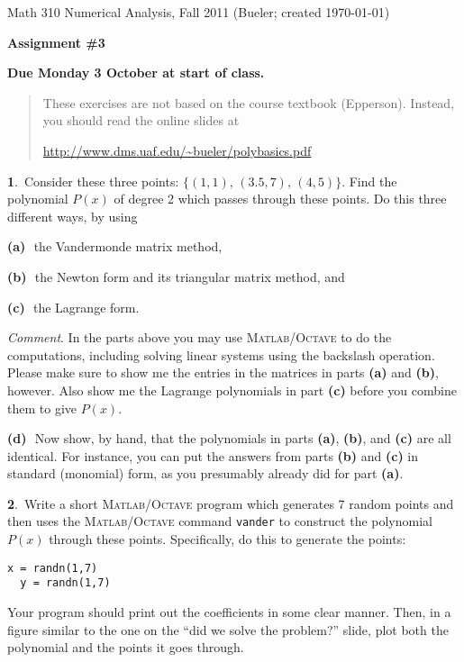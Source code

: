 \documentclass[12pt]{amsart}
\newcommand{\normalspacing}{\renewcommand{\baselinestretch}{1.1}
        \tiny\normalsize}
\newcommand{\prob}[1]{\bigskip\noindent\large\textbf{#1}.\,\normalsize }
\newcommand{\epart}[1]{\medskip\noindent\textbf{(#1)}\,\, }
\newcommand{\Matlab}{\textsc{Matlab}\xspace}
\newcommand{\Octave}{\textsc{Octave}\xspace}
\newcommand{\MO}{\Matlab/\Octave}
\begin{document}
\scriptsize \noindent Math 310 Numerical Analysis, Fall 2011 \hfill (Bueler; created \today)
\normalsize\bigskip

\Large\centerline{\textbf{Assignment \#3}}
\normalsize\medskip

\large
\centerline{\textbf{Due Monday 3 October at start of class.}}
\normalsize\bigskip
\thispagestyle{empty}

\renewcommand{\baselinestretch}{0.5}  \tiny\normalsize
\begin{quote}\small
These exercises are not based on the course textbook (Epperson).  Instead, you should read the online slides at
  \begin{center}
  \url{http://www.dms.uaf.edu/~bueler/polybasics.pdf}
  \end{center}
\normalsize
\end{quote}
\normalspacing

\bigskip

\prob{1}  Consider these three points:  $\{(1,1),\, (3.5,7), \,(4,5)\}$.  Find the polynomial $P(x)$ of degree 2 which passes through these points.  Do this three different ways, by using

\epart{a} the Vandermonde matrix method,

\epart{b} the Newton form and its triangular matrix method, and

\epart{c} the Lagrange form.

\medskip\noindent\emph{Comment}.  In the parts above you may use \MO to do the computations, including solving linear systems using the backslash operation.  Please make sure to show me the entries in the matrices in parts \textbf{(a)} and \textbf{(b)}, however.  Also show me the Lagrange polynomials in part \textbf{(c)} before you combine them to give $P(x)$.

\epart{d}  Now show, by hand, that the polynomials in parts \textbf{(a)}, \textbf{(b)}, and \textbf{(c)} are all identical.  For instance, you can put the answers from parts \textbf{(b)} and \textbf{(c)} in standard (monomial) form, as you presumably already did for part \textbf{(a)}.

\prob{2}  Write a short \MO program which generates 7 random points and then uses the \MO command \texttt{vander} to construct the polynomial $P(x)$ through these points.  Specifically, do this to generate the points:
\begin{Verbatim}[frame=single,fontfamily=courier,fontsize=\scriptsize]
  x = randn(1,7)
  y = randn(1,7)
\end{Verbatim}
Your program should print out the coefficients in some clear manner.  Then, in a figure similar to the one on the ``did we solve the problem?'' slide, plot both the polynomial and the points it goes through.
\end{document}
